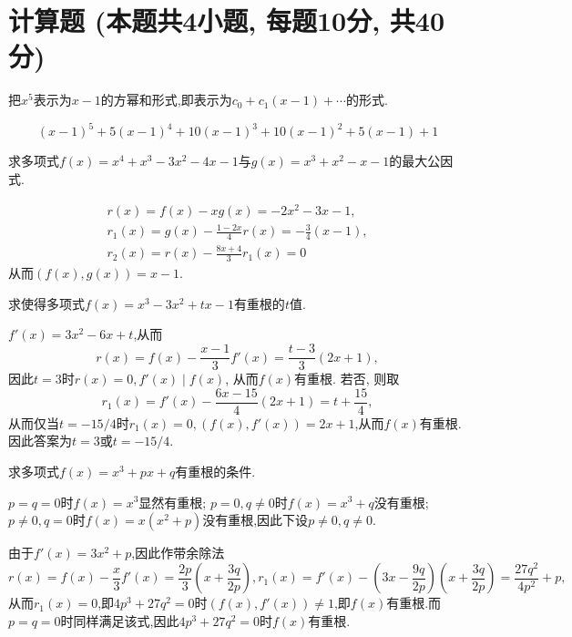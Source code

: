 \documentclass{exam-zh}
\begin{document}
\section{计算题 (本题共4小题, 每题10分, 共40分)}
\begin{problem}
    把$x^5$表示为$x-1$的方幂和形式,即表示为$c_0+c_1(x-1)+\cdots$的形式.
\end{problem}
\begin{solution}
    $$(x-1)^5+5 (x-1)^4+10 (x-1)^3+10 (x-1)^2+5 (x-1)+1$$
\end{solution}
\vspace{10em}
\begin{problem}
    求多项式$f(x)=x^4+x^3-3x^2-4x-1$与$g(x)=x^3+x^2-x-1$的最大公因式.
\end{problem}
\begin{solution}
    $$\begin{gathered}
        r(x)=f(x)-x g(x)=-2x^2-3x-1,\\
        r_1(x)=g(x)-\frac{1-2x}{4}r(x)=-\frac{3}{4}(x-1),\\
        r_2(x)=r(x)-\frac{8x+4}{3}r_1(x)=0
    \end{gathered}$$
    从而$(f(x),g(x))=x-1$.
\end{solution}
\vspace{10em}
\begin{problem}
    求使得多项式$f(x)=x^3-3x^2+tx-1$有重根的$t$值.
\end{problem}
\begin{solution}
    $f'(x)=3x^2-6x+t$,从而
    $$r(x)=f(x)-\frac{x-1}{3}f'(x)=\frac{t-3}{3}(2x+1),$$
    因此$t=3$时$r(x)=0, f'(x)\mid f(x)$, 从而$f(x)$有重根. 若否, 则取
    $$r_1(x)=f'(x)-\frac{6x-15}{4}(2x+1)=t+\frac{15}{4},$$
    从而仅当$t=-15/4$时$r_1(x)=0, (f(x),f'(x))=2x+1$,从而$f(x)$有重根.因此答案为$t=3$或$t=-15/4$.
\end{solution}
\vspace{10em}

\newpage
\begin{problem}
    求多项式$f(x)=x^3+px+q$有重根的条件.
\end{problem}
\begin{solution}
    $p=q=0$时$f(x)=x^3$显然有重根; $p=0, q\neq 0$时$f(x)=x^3+q$没有重根; $p\neq 0, q=0$时$f(x)=x(x^2+p)$没有重根,因此下设$p\neq 0, q\neq 0$.

    由于$f'(x)=3x^2+p$,因此作带余除法
    $$r(x)=f(x)-\frac{x}{3}f'(x)=\frac{2p}{3}\left(x+\frac{3q}{2p}\right), r_1(x)=f'(x)-\left(3 x-\frac{9 q}{2 p}\right)\left(x+\frac{3q}{2p}\right)=\frac{27 q^2}{4 p^2}+p,$$
    从而$r_1(x)=0$,即$4p^3+27q^2=0$时$(f(x),f'(x))\neq 1$,即$f(x)$有重根.而$p=q=0$时同样满足该式,因此$4p^3+27q^2=0$时$f(x)$有重根.
\end{solution}
\vspace{20em}
\end{document}
